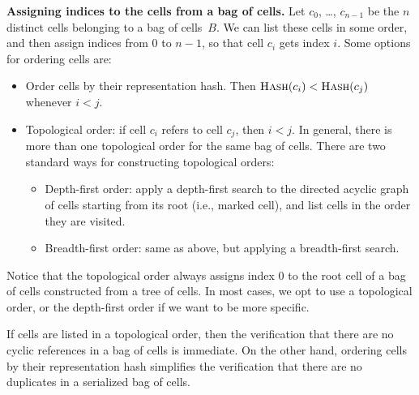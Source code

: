 \documentclass[12pt,oneside]{article}
\def\makepoint#1{\medbreak\noindent{\bf #1.\ }}
\def\nxsubpoint{\refstepcounter{subsubsection}%
  \smallbreak\makepoint{\thesubsubsection}}
\def\emb#1{\textbf{#1.}}
\def\opsc#1{\operatorname{\textsc{#1}}}
\def\Hash{\opsc{Hash}}
\begin{document}
\nxsubpoint\emb{Assigning indices to the cells from a bag of cells}
Let $c_0$, \dots, $c_{n-1}$ be the $n$ distinct cells belonging to a bag of cells~$B$. We can list these cells in some order, and then assign indices from $0$ to $n-1$, so that cell $c_i$ gets index $i$. Some options for ordering cells are:
\begin{itemize}
\item Order cells by their representation hash. Then $\Hash(c_i)<\Hash(c_j)$ whenever $i<j$.
\item Topological order: if cell $c_i$ refers to cell $c_j$, then $i<j$. In general, there is more than one topological order for the same bag of cells. There are two standard ways for constructing topological orders:
  \begin{itemize}
  \item Depth-first order: apply a depth-first search to the directed acyclic graph of cells starting from its root (i.e., marked cell), and list cells in the order they are visited.
  \item Breadth-first order: same as above, but applying a breadth-first search.
  \end{itemize}
\end{itemize}
Notice that the topological order always assigns index $0$ to the root cell of a bag of cells constructed from a tree of cells. In most cases, we opt to use a topological order, or the depth-first order if we want to be more specific.

If cells are listed in a topological order, then the verification that there are no cyclic references in a bag of cells is immediate. On the other hand, ordering cells by their representation hash simplifies the verification that there are no duplicates in a serialized bag of cells.
\end{document}
